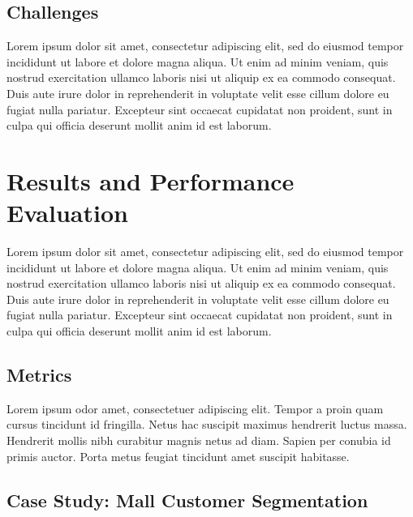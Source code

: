 \documentclass[10pt,twocolumn,letterpaper]{article}
\begin{document}

\subsection{Challenges}\label{subsec:challenges}

Lorem ipsum dolor sit amet, consectetur adipiscing elit, sed do eiusmod tempor
incididunt ut labore et dolore magna aliqua. Ut enim ad minim veniam, quis
nostrud exercitation ullamco laboris nisi ut aliquip ex ea commodo consequat.
Duis aute irure dolor in reprehenderit in voluptate velit esse cillum dolore eu
fugiat nulla pariatur. Excepteur sint occaecat cupidatat non proident, sunt in
culpa qui officia deserunt mollit anim id est laborum.


\section{Results and Performance Evaluation}\label{sec:results-and-performance-evaluation}

Lorem ipsum dolor sit amet, consectetur adipiscing elit, sed do eiusmod tempor
incididunt ut labore et dolore magna aliqua. Ut enim ad minim veniam, quis
nostrud exercitation ullamco laboris nisi ut aliquip ex ea commodo consequat.
Duis aute irure dolor in reprehenderit in voluptate velit esse cillum dolore eu
fugiat nulla pariatur. Excepteur sint occaecat cupidatat non proident, sunt in
culpa qui officia deserunt mollit anim id est laborum.


\subsection{Metrics}

Lorem ipsum odor amet, consectetuer adipiscing elit. Tempor a proin quam cursus
tincidunt id fringilla. Netus hac suscipit maximus hendrerit luctus massa.
Hendrerit mollis nibh curabitur magnis netus ad diam. Sapien per conubia id
primis auctor. Porta metus feugiat tincidunt amet suscipit habitasse.


\subsection{Case Study: Mall Customer Segmentation}
\end{document}

